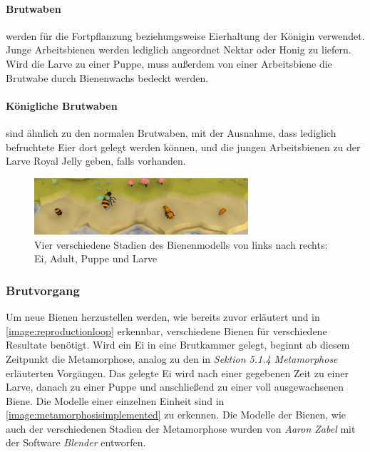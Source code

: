 \paragraph{Brutwaben} werden für die Fortpflanzung beziehungsweise Eierhaltung der Königin verwendet. Junge Arbeitsbienen werden lediglich angeordnet Nektar oder Honig zu liefern. Wird die Larve zu einer Puppe, muss außerdem von einer Arbeitsbiene die Brutwabe durch Bienenwachs bedeckt werden.

\paragraph{Königliche Brutwaben} sind ähnlich zu den normalen Brutwaben, mit der Ausnahme, dass lediglich befruchtete Eier dort gelegt werden können, und die jungen Arbeitsbienen zu der Larve Royal Jelly geben, falls vorhanden.

\begin{figure}
    \begin{center}
        \includegraphics[width=300px]{0.bilder/metamorphosisimplemented.jpg}
    \end{center}
    \caption{Vier verschiedene Stadien des Bienenmodells von links nach rechts: Ei, Adult, Puppe und Larve} \label{image:metamorphosisimplemented}
\end{figure}

\subsubsection{Brutvorgang}
Um neue Bienen herzustellen werden, wie bereits zuvor erläutert und in \autoref{image:reproductionloop} erkennbar, verschiedene Bienen für verschiedene Resultate benötigt. Wird ein Ei in eine Brutkammer gelegt, beginnt ab diesem Zeitpunkt die Metamorphose, analog zu den in \textit{Sektion 5.1.4 Metamorphose} erläuterten Vorgängen. Das gelegte Ei wird nach einer gegebenen Zeit zu einer Larve, danach zu einer Puppe und anschließend zu einer voll ausgewachsenen Biene. Die Modelle einer einzelnen Einheit sind in \autoref{image:metamorphosisimplemented} zu erkennen. Die Modelle der Bienen, wie auch der verschiedenen Stadien der Metamorphose wurden von \textit{Aaron Zabel} \cite*[]{aaron0zabel} mit der Software \textit{Blender} entworfen.

